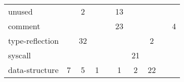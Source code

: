 \begin{table}[h]
\begin{tabularx}{\textwidth}{Xccccccccc}
        \rowcolor{verylightgray}
        unused &            &        2 &                &               &     13 &            &               &                        &               \\
        comment &            &          &                &               &     23 &            &               &                        &             4 \\
        \rowcolor{verylightgray}
        type-reflection &            &       32 &                &               &        &            &             2 &                        &               \\
        syscall &            &          &                &               &        &         21 &               &                        &               \\
        \rowcolor{verylightgray}
        data-structure &          7 &        5 &              1 &               &      1 &          2 &            22 &                        &               \\
        \bottomrule
    \end{tabularx}
\end{table}

